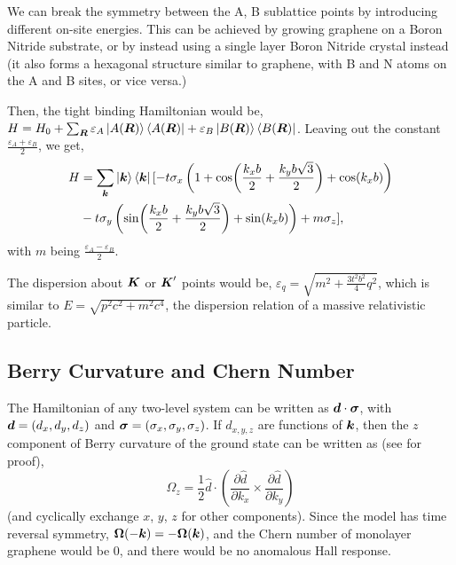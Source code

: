 \documentclass{report}
\renewcommand\vec[1]{\ensuremath\boldsymbol{#1}} %
\begin{document}
We can break the symmetry between the A, B sublattice points by introducing different on-site energies. This can be achieved by growing graphene on a Boron Nitride substrate, or by instead using a single layer Boron Nitride crystal instead (it also forms a hexagonal structure similar to graphene, with B and N atoms on the A and B sites, or vice versa.)

Then, the tight binding Hamiltonian would be,
$H = H_0 + \sum_{\vec{R}} \varepsilon_A \ket{A(\vec{R})} \bra{A(\vec{R})} + \varepsilon_B \ket{B(\vec{R})} \bra{B(\vec{R})}$. Leaving out the constant  $\frac{\varepsilon_A + \varepsilon_B}{2}$, we get,
\begin{equation}\label{Eq:GrapheneHopping}
	\begin{aligned}
H &=  \sum_{\vec{k}} \ket{\vec{k}}\bra{\vec{k}} [-t \sigma_x \left(1 + \cos(\frac{k_x b}{2} + \frac{k_y b \sqrt{3}}{2}) + \cos(k_x b)\right) \\
& -t \sigma_y \left( \sin(\frac{k_x b}{2}  + \frac{k_y b \sqrt{3}}{2}) + \sin(k_x b)\right)  + m \sigma_z ],
	\end{aligned}
\end{equation} with $m$ being $\frac{\varepsilon_A - \varepsilon_B}{2}$.

The dispersion about $\vec{K}$ or $\vec{K}'$ points would be, $\varepsilon_{q} = \sqrt{m^2 + \frac{3 t^2 b^2}{4} q^2} $, which is similar to $E = \sqrt{p^2 c^2 + m^2 c^4}$, the dispersion relation of a massive relativistic particle.

\subsection{Berry Curvature and Chern Number}
The Hamiltonian of any two-level system can be written as $\vec{d} \cdot \vec{\sigma}$, with $\vec{d} = (d_x, d_y, d_z)$ and $\vec{\sigma} = (\sigma_x, \sigma_y, \sigma_z)$. If $d_{x,y,z}$ are functions of $\vec{k}$, then the $z$ component of Berry curvature of the ground state can be written as (see \cite{shankar2018topological} for proof),
\begin{equation}\label{Eq:BerryTwoBandFormula}
	\Omega_z = 
	\frac{1}{2} \hat{d} \cdot \left(\frac{\partial \hat{d}}{\partial k_x} \times \frac{\partial \hat{d}}{\partial k_y} \right)
\end{equation}
(and cyclically exchange $x$, $y$, $z$ for other components).
Since the model has time reversal symmetry, $\vec{\Omega}(-\vec{k}) = -\vec{\Omega}(\vec{k})$, and the Chern number of monolayer graphene would be $0$, and there would be no anomalous Hall response.
\end{document}
